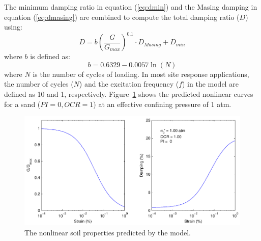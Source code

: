 \documentclass[11pt]{report}
\begin{document}
The minimum damping ratio in equation (\ref{eq:dmin}) and the Masing damping in equation
(\ref{eq:dmasing}) are combined to compute the total damping ratio ($D$) using:
\begin{equation}
  D = b  \left( \frac{G}{G_{max}} \right)^{0.1} \cdot D_{Masing} + D_{min} 
  \label{eq:damping}
\end{equation}
where $b$ is defined as:
\begin{equation}
  b = 0.6329 - 0.0057 \ln\left( N \right)
\end{equation}
where $N$ is the number of cycles of loading.  In most site response applications, the number of
cycles ($N$) and the excitation frequency ($f$) in the model are defined as 10 and 1,
respectively.  Figure~\ref{fig:siteResponse:nlEmpirical} shows the predicted nonlinear curves for a sand
($PI=0, OCR=1$) at an effective confining pressure of 1 atm.

\begin{figure}[tb]
  \begin{center}
	\includegraphics[width=\linewidth]{figures/siteResponse/nlEmpirical.pdf}
  \end{center}
  \caption{The nonlinear soil properties predicted by the \citet{darendeli:01} model.}
  \label{fig:siteResponse:nlEmpirical}
\end{figure}
\end{document}
